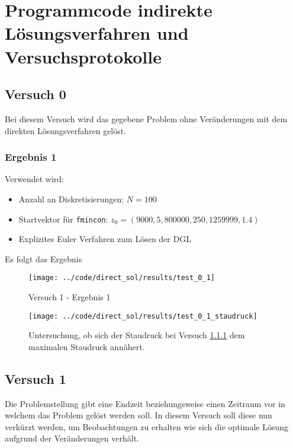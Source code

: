 \chapter{Programmcode indirekte Lösungsverfahren und Versuchsprotokolle}\label{Anhang:IndirektV}



\section{Versuch 0}\label{kap:Versuch0}
Bei diesem Versuch wird das gegebene Problem ohne Veränderungen mit dem direkten Lösungsverfahren gelöst.

\subsection{Ergebnis 1}\label{kap:Versuch01}
Verwendet wird:
\begin{itemize}
\item Anzahl an Diskretisierungen: $N = 100$ 
\item Startvektor für \texttt{fmincon}: $z_0 = (9000,5,800000,250,1259999,1.4)$
\item Explizites Euler Verfahren zum Lösen der DGL
\end{itemize}
Es folgt das Ergebnis
\begin{figure}[H]
\begin{center}
\texttt{[image: ../code/direct\_sol/results/test\_0\_1]}
\caption{Versuch 1 - Ergebnis 1}\label{img:test_0_1}
\end{center}
\end{figure}

\begin{figure}[H]
\begin{center}
\texttt{[image: ../code/direct\_sol/results/test\_0\_1\_staudruck]}
\caption{Untersuchung, ob sich der Staudruck bei Versuch \ref{kap:Versuch01} dem maximalen Staudruck annähert.}\label{img:test_0_1_staudruck}
\end{center}
\end{figure}















\section{Versuch 1}\label{kap:Versuch1}
Die Problemstellung gibt eine Endzeit beziehungsweise einen Zeitraum vor in welchem das Problem gelöst werden soll. In diesem Versuch soll diese nun verkürzt werden, um Beobachtungen zu erhalten wie sich die optimale Lösung aufgrund der Veränderungen verhält. %

